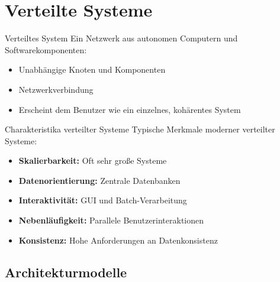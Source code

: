 \section{Verteilte Systeme}

\begin{definition}{Verteiltes System}
Ein Netzwerk aus autonomen Computern und Softwarekomponenten:
\begin{itemize}
    \item Unabhängige Knoten und Komponenten
    \item Netzwerkverbindung
    \item Erscheint dem Benutzer wie ein einzelnes, kohärentes System
\end{itemize}
\end{definition}

\begin{concept}{Charakteristika verteilter Systeme}
Typische Merkmale moderner verteilter Systeme:
\begin{itemize}
    \item \textbf{Skalierbarkeit:} Oft sehr große Systeme
    \item \textbf{Datenorientierung:} Zentrale Datenbanken
    \item \textbf{Interaktivität:} GUI und Batch-Verarbeitung
    \item \textbf{Nebenläufigkeit:} Parallele Benutzerinteraktionen
    \item \textbf{Konsistenz:} Hohe Anforderungen an Datenkonsistenz
\end{itemize}
\end{concept}

\subsection{Architekturmodelle}

